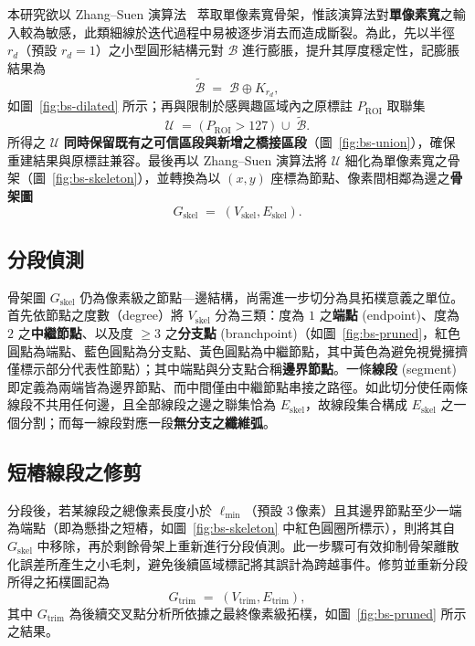 本研究欲以 Zhang--Suen 演算法~\cite{zhang1984fast} 萃取單像素寬骨架，惟該演算法對\textbf{單像素寬}之輸入較為敏感，此類細線於迭代過程中易被逐步消去而造成斷裂。為此，先以半徑 $r_d$（預設 $r_d = 1$）之小型圓形結構元對 $\mathcal{B}$ 進行膨脹，提升其厚度穩定性，記膨脹結果為
\begin{equation}
  \tilde{\mathcal{B}} \;=\; \mathcal{B} \oplus K_{r_d},
  \label{eq:bridge-dilated}
\end{equation}
如圖~\ref{fig:bs-dilated} 所示；再與限制於感興趣區域內之原標註 $P_{\text{ROI}}$ 取聯集
\begin{equation}
  \mathcal{U} \;=\; \bigl(\,P_{\text{ROI}} > 127\,\bigr) \;\cup\; \tilde{\mathcal{B}}.
  \label{eq:union}
\end{equation}
所得之 $\mathcal{U}$ \textbf{同時保留既有之可信區段與新增之橋接區段}（圖~\ref{fig:bs-union}），確保重建結果與原標註兼容。最後再以 Zhang--Suen 演算法將 $\mathcal{U}$ 細化為單像素寬之骨架（圖~\ref{fig:bs-skeleton}），並轉換為以 $(x, y)$ 座標為節點、像素間相鄰為邊之\textbf{骨架圖}
\begin{equation}
  G_{\text{skel}} \;=\; (V_{\text{skel}}, E_{\text{skel}}).
  \label{eq:gskel}
\end{equation}


\subsection{分段偵測}
\label{subsec:segment}

骨架圖 $G_{\text{skel}}$ 仍為像素級之節點—邊結構，尚需進一步切分為具拓樸意義之單位。首先依節點之度數（degree）將 $V_{\text{skel}}$ 分為三類：度為 $1$ 之\textbf{端點} (endpoint)、度為 $2$ 之\textbf{中繼節點}、以及度 $\ge 3$ 之\textbf{分支點} (branchpoint)（如圖~\ref{fig:bs-pruned}，紅色圓點為端點、藍色圓點為分支點、黃色圓點為中繼節點，其中黃色為避免視覺擁擠僅標示部分代表性節點）；其中端點與分支點合稱\textbf{邊界節點}。一條\textbf{線段} (segment) 即定義為兩端皆為邊界節點、而中間僅由中繼節點串接之路徑。如此切分使任兩條線段不共用任何邊，且全部線段之邊之聯集恰為 $E_{\text{skel}}$，故線段集合構成 $E_{\text{skel}}$ 之一個分割；而每一線段對應一段\textbf{無分支之纖維弧}。

\subsection{短樁線段之修剪}
\label{subsec:stub-prune}

分段後，若某線段之總像素長度小於 $\ell_{\min}$（預設 $3\,\text{像素}$）且其邊界節點至少一端為端點（即為懸掛之短樁，如圖~\ref{fig:bs-skeleton} 中紅色圓圈所標示），則將其自 $G_{\text{skel}}$ 中移除，再於剩餘骨架上重新進行分段偵測。此一步驟可有效抑制骨架離散化誤差所產生之小毛刺，避免後續區域標記將其誤計為跨越事件。修剪並重新分段所得之拓樸圖記為
\begin{equation*}
  G_{\text{trim}} \;=\; (V_{\text{trim}}, E_{\text{trim}}),
\end{equation*}
\noindent 其中 $G_{\text{trim}}$ 為後續交叉點分析所依據之最終像素級拓樸，如圖~\ref{fig:bs-pruned} 所示之結果。


